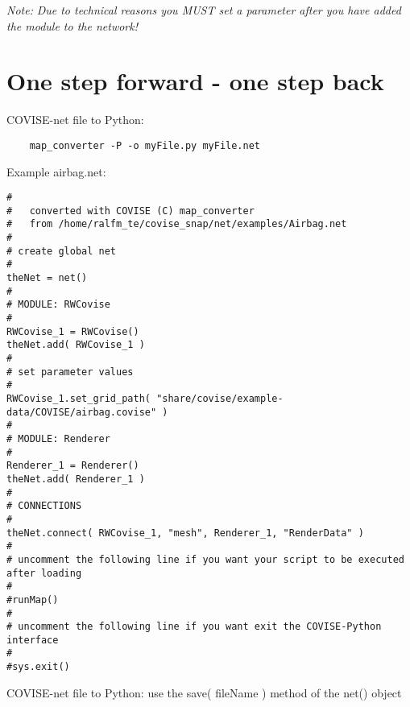 {\it Note:}\newline
{\it Due to technical reasons you MUST set a parameter after you have added the module to the
network!}
\vspace{0.5cm}

\section{One step forward - one step back}

COVISE-net file to Python:

\begin{verbatim}
    map_converter -P -o myFile.py myFile.net
\end{verbatim}
   
Example airbag.net:

\begin{verbatim}
#
#   converted with COVISE (C) map_converter
#   from /home/ralfm_te/covise_snap/net/examples/Airbag.net
#
# create global net
#
theNet = net()
#
# MODULE: RWCovise
#
RWCovise_1 = RWCovise()
theNet.add( RWCovise_1 )
#
# set parameter values
#
RWCovise_1.set_grid_path( "share/covise/example-data/COVISE/airbag.covise" )
#
# MODULE: Renderer
#
Renderer_1 = Renderer()
theNet.add( Renderer_1 )
#
# CONNECTIONS
#
theNet.connect( RWCovise_1, "mesh", Renderer_1, "RenderData" )
#
# uncomment the following line if you want your script to be executed after loading
#
#runMap()
#
# uncomment the following line if you want exit the COVISE-Python interface
#
#sys.exit()
\end{verbatim}
\vspace{0.5cm}
COVISE-net file to Python:
	use the save( fileName ) method of the net() object


